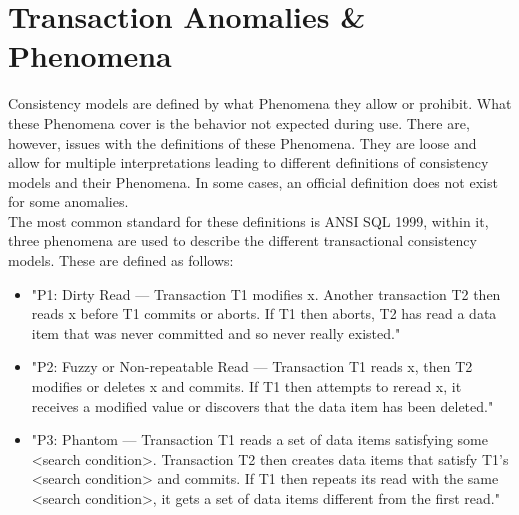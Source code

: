 \documentclass[a4paper,10pt,titlepage]{report}
\begin{document}
\newpage
\section{Transaction Anomalies \& Phenomena}

Consistency models are defined by what Phenomena they allow or prohibit. What these Phenomena cover is the behavior not expected during use. There are, however, issues with the definitions of these Phenomena. They are loose and allow for multiple interpretations leading to different definitions of consistency models and their Phenomena. In some cases, an official definition does not exist for some anomalies.\\

The most common standard for these definitions is ANSI SQL 1999\cite{ansisql1999}, within it, three phenomena are used to describe the different transactional consistency models. These are defined as follows:
\begin{itemize}
    \item "P1: Dirty Read — Transaction T1 modifies x. Another transaction T2 then reads x before T1 commits or aborts. If T1 then aborts, T2 has read a data item that was never committed and so never really existed."
    \item "P2: Fuzzy or Non-repeatable Read — Transaction T1 reads x, then T2 modifies or deletes x and commits. If T1 then attempts to reread x, it receives a modified value or discovers that the data item has been deleted."
    \item "P3: Phantom — Transaction T1 reads a set of data items satisfying some <search condition>. Transaction T2 then creates data items that satisfy T1's <search condition> and commits. If T1 then repeats its read with the same <search condition>, it gets a set of data items different from the first read."
\end{itemize}
\end{document}
